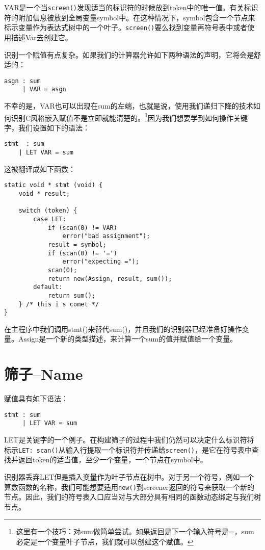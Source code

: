 VAR是一个当\verb|screen()|发现适当的标识符的时候放到token中的唯一值。有关标识符的附加信息被放到全局变量symbol中。在这种情况下，symbol包含一个节点来标示变量作为表达式树中的一个叶子。\verb|screen()|要么找到变量再符号表中或者使用描述Var去创建它。

识别一个赋值有点复杂。如果我们的计算器允许如下两种语法的声明，它将会是舒适的：

\begin{lstlisting}
asgn : sum
	 | VAR = asgn
\end{lstlisting}

不幸的是，VAR也可以出现在sum的左端，也就是说，使用我们递归下降的技术如何识别C风格嵌入赋值不是立即就能清楚的。\footnote{这里有一个技巧：对sum做简单尝试。如果返回是下一个输入符号是=，sum必定是一个变量叶子节点，我们就可以创建这个赋值。}因为我们想要学到如何操作关键字，我们设置如下的语法：

\begin{lstlisting}
stmt  : sum
	| LET VAR = sum
\end{lstlisting}

这被翻译成如下函数：

\begin{lstlisting}
static void * stmt (void) {
	void * result;
	
	switch (token) {
		case LET:
			if (scan(0) != VAR)
				error("bad assignment");
			result = symbol;
			if (scan(0) != '=')
				error("expecting =");
			scan(0);
			return new(Assign, result, sum());
		default:
			return sum();
	} /* this i s comet */
}
\end{lstlisting}

在主程序中我们调用stmt()来替代sum()，并且我们的识别器已经准备好操作变量。Assign是一个新的类型描述，来计算一个sum的值并赋值给一个变量。

\section{筛子--Name}

赋值具有如下语法：

\begin{lstlisting}
stmt : sum
     | LET VAR = sum
\end{lstlisting}

LET是关键字的一个例子。在构建筛子的过程中我们仍然可以决定什么标识符将标示\verb|LET: scan()|从输入行提取一个标识符并传递给\verb|screen()|，是它在符号表中查找并返回token的适当值，至少一个变量，一个节点在symbol中。

识别器丢弃LET但是插入变量作为叶子节点在树中。对于另一个符号，例如一个算数函数的名称，我们可能想要适用\verb|new()|到screener返回的符号来获取一个新的节点。因此，我们的符号表入口应当对与大部分具有相同的函数动态绑定与我们树节点。

